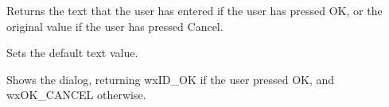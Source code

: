 \label{wxtextentrydialoggetvalue}


Returns the text that the user has entered if the user has pressed OK, or the original value
if the user has pressed Cancel.

\label{wxtextentrydialogsetvalue}


Sets the default text value.

\label{wxtextentrydialogshowmodal}


Shows the dialog, returning wxID\_OK if the user pressed OK, and wxOK\_CANCEL
otherwise.



